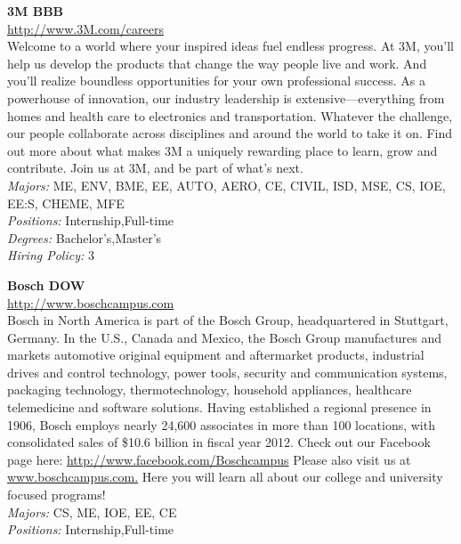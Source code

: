 \documentclass[twoside]{article}
\begin{document}
    \begin{center}\begin{multicols}{2}
    \begin{minipage}{.95\columnwidth}{\Large\bf 3M \hfill BBB}\\
    \url{http://www.3M.com/careers}\\
    Welcome to a world where your inspired ideas fuel endless progress. At 3M, you’ll help us develop the products that change the way people live and work. And you’ll realize boundless opportunities for your own professional success. As a powerhouse of innovation, our industry leadership is extensive—everything from homes and health care to electronics and transportation. Whatever the challenge, our people collaborate across disciplines and around the world to take it on. Find out more about what makes 3M a uniquely rewarding place to learn, grow and contribute. Join us at 3M, and be part of what’s next.\\
    \emph{Majors:} ME, ENV, BME, EE, AUTO, AERO, CE, CIVIL, ISD, MSE, CS, IOE, EE:S, CHEME, MFE\\
    \emph{Positions:} Internship,Full-time\\
    \emph{Degrees:} Bachelor's,Master's\\
    \emph{Hiring Policy:} 3\\
\end{minipage}
 \begin{minipage}{.95\columnwidth}{\Large\bf Bosch \hfill DOW}\\
    \url{http://www.boschcampus.com}\\
    Bosch in North America is part of the Bosch Group, headquartered in Stuttgart, Germany. In the U.S., Canada and Mexico, the Bosch Group manufactures and markets automotive original equipment and aftermarket products, industrial drives and control technology, power tools, security and communication systems, packaging technology, thermotechnology, household appliances, healthcare telemedicine and software solutions. Having established a regional presence in 1906, Bosch employs nearly 24,600 associates in more than 100 locations, with consolidated sales of \$10.6 billion in fiscal year 2012. Check out our Facebook page here: \url{http://www.facebook.com/Boschcampus} Please also visit us at \url{www.boschcampus.com.} Here you will learn all about our college and university focused programs!\\
    \emph{Majors:} CS, ME, IOE, EE, CE\\
    \emph{Positions:} Internship,Full-time\\

\end{minipage}
\end{multicols}
\end{center}
\end{document}
